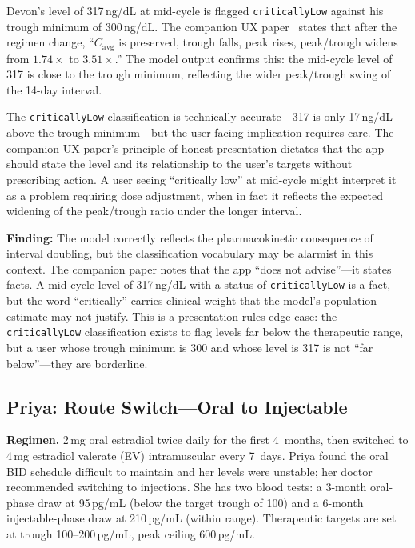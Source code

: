 \documentclass[11pt,a4paper]{article}
\newcommand{\code}[1]{\texttt{\small #1}}
\begin{document}
Devon's level of 317\,ng/dL at mid-cycle is flagged \code{criticallyLow}
against his trough minimum of 300\,ng/dL. The companion UX
paper~\cite{xtux} states that after the regimen change, ``$C_{\mathrm{avg}}$
is preserved, trough falls, peak rises, peak/trough widens from
$1.74\times$ to $3.51\times$.'' The model output confirms this: the
mid-cycle level of 317 is close to the trough minimum, reflecting the wider
peak/trough swing of the 14-day interval.

The \code{criticallyLow} classification is technically accurate---317 is
only 17\,ng/dL above the trough minimum---but the user-facing implication
requires care. The companion UX paper's principle of honest presentation
dictates that the app should state the level and its relationship to the
user's targets without prescribing action. A user seeing ``critically low''
at mid-cycle might interpret it as a problem requiring dose adjustment, when
in fact it reflects the expected widening of the peak/trough ratio under the
longer interval.

\textbf{Finding:} The model correctly reflects the pharmacokinetic
consequence of interval doubling, but the classification vocabulary may be
alarmist in this context. The companion paper notes that the app ``does not
advise''---it states facts. A mid-cycle level of 317\,ng/dL with a status of
\code{criticallyLow} is a fact, but the word ``critically'' carries clinical
weight that the model's population estimate may not justify. This is a
presentation-rules edge case: the \code{criticallyLow} classification exists
to flag levels far below the therapeutic range, but a user whose trough
minimum is 300 and whose level is 317 is not ``far below''---they are
borderline.

\subsection{Priya: Route Switch---Oral to Injectable}
\label{sec:priya}

\textbf{Regimen.} 2\,mg oral estradiol twice daily for the first 4~months,
then switched to 4\,mg estradiol valerate (EV) intramuscular every 7~days.
Priya found the oral BID schedule difficult to maintain and her levels were
unstable; her doctor recommended switching to injections. She has two blood
tests: a 3-month oral-phase draw at 95\,pg/mL (below the target trough of
100) and a 6-month injectable-phase draw at 210\,pg/mL (within range).
Therapeutic targets are set at trough 100--200\,pg/mL, peak ceiling
600\,pg/mL.
\end{document}
